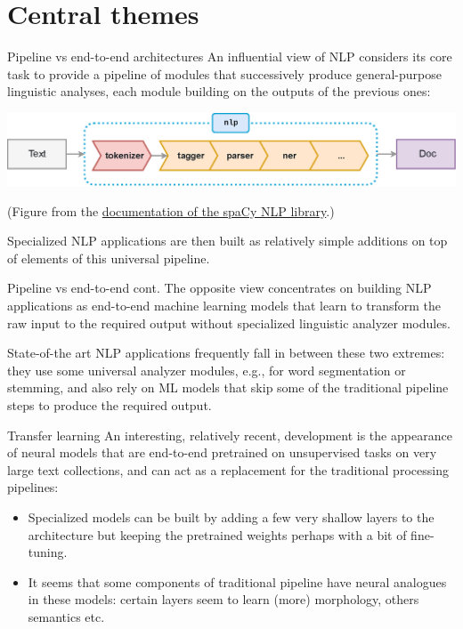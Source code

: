 \documentclass[style=upen, size=14pt]{powerdot}
\newcommand{\gold}{\color{arany}}
\begin{document}
\section{Central themes}

\begin{slide}[toc=Pipeline]{Pipeline vs end-to-end architectures}
  An influential view of NLP considers its core task to provide a {\gold
    pipeline of modules} that successively produce general-purpose linguistic
  analyses, each module building on the outputs of the previous ones: \bigskip

  \includegraphics[width=1.05\textwidth]{pipeline.eps}
  
  \footnotesize{(Figure from the
    \href{https://spacy.io/usage/processing-pipelines}{documentation of the
      spaCy NLP library}.)}\bigskip\pause
  
  \normalsize Specialized NLP applications are then built as relatively simple
  additions on top of elements of this universal pipeline.
\end{slide}

\begin{slide}[toc=End-to-end]{Pipeline vs end-to-end cont.}
  The opposite view concentrates on building NLP applications as {\gold
    end-to-end} machine learning models that learn to transform the raw input to
  the required output without specialized linguistic analyzer modules.\pause

  \bigskip
  
  State-of-the art NLP applications frequently fall in between these two
  extremes: they use some universal analyzer modules, e.g., for word
  segmentation or stemming, and also rely on ML models that skip some of the
  traditional pipeline steps to produce the required output.
\end{slide}

\begin{slide}{Transfer learning}
  An interesting, relatively recent, development is the appearance of neural
  models that are end-to-end pretrained on unsupervised tasks on very large text
  collections, and can act as a replacement for the traditional processing
  pipelines:\pause
  \begin{itemize}
  \item Specialized models can be built by adding a few very shallow layers to
    the architecture but keeping the pretrained weights perhaps with a bit of
    fine-tuning.\pause
  \item It seems that some components of traditional pipeline have neural
    analogues in these models: certain layers seem to learn (more) morphology,
    others semantics etc.\pause
  \end{itemize}
\end{slide}
\end{document}
